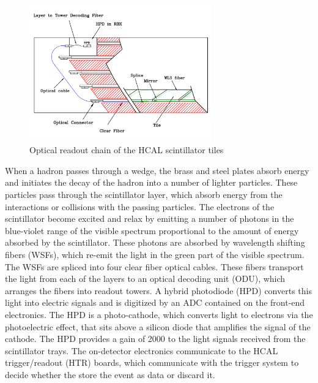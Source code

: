 \begin{figure}[h]
   \centering
  \includegraphics[width=0.7\textwidth]{Figures/CMS_Diagrams/HCAL__OpticalReadout.pdf}
  \caption{Optical readout chain of the HCAL scintillator tiles} \label{fig:hcal_navy_shells}
\end{figure}

\par When a hadron passes through a wedge, the brass and steel plates
absorb energy and initiates the decay of the hadron into a number of
lighter particles.  These particles pass through the scintillator
layer, which absorb energy from the interactions or collisions with
the passing particles.  The electrons of the scintillator become
excited and relax by emitting a number of photons in the blue-violet
range of the visible spectrum proportional to the amount of energy
absorbed by the scintillator.   These photons are absorbed by
wavelength shifting fibers (WSFs), which re-emit the light in the
green part of the visible spectrum.  The WSFs are spliced into 
four clear fiber optical cables.  These fibers transport the light
from each of the layers to an optical decoding unit (ODU), which
arranges the fibers into readout towers.  A hybrid photodiode (HPD)
converts this light into electric signals and is digitized by an ADC
contained on the front-end electronics.  The HPD is a photo-cathode,
which converts light to electrons via the photoelectric effect, that
sits above a silicon diode that amplifies the signal of the cathode.
The HPD provides a gain of 2000 to the light signals received from the
scintillator trays.  The on-detector electronics communicate to the
HCAL trigger/readout (HTR) boards, which communicate with the trigger
system to decide whether the store the event as data or discard it.  

